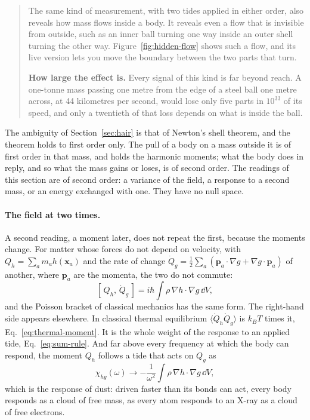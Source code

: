 \begin{quote}
The same kind of measurement, with two tides applied in either order, also
reveals how mass flows inside a body. It reveals even a flow that is invisible
from outside, such as an inner ball turning one way inside an outer shell
turning the other way. Figure~\ref{fig:hidden-flow} shows such a flow, and its live version lets you move the boundary between the two parts that turn.

\textbf{How large the effect is.} Every signal of this kind is far beyond reach.
A one-tonne mass passing one metre from the edge of a steel ball one metre
across, at 44 kilometres per second, would lose only five parts in $10^{33}$ of
its speed, and only a twentieth of that loss depends on what is inside the ball.
\end{quote}

The ambiguity of Section~\ref{sec:hair} is that of Newton's shell theorem, and
the theorem holds to first order only. The pull of a body on a mass outside it
is of first order in that mass, and holds the harmonic moments; what the body
does in reply, and so what the mass gains or loses, is of second order. The
readings of this section are of second order: a variance of the field, a
response to a second mass, or an energy exchanged with one. They have no null
space.

\paragraph{The field at two times.} A second reading, a moment later, does not
repeat the first, because the moments change. For matter whose forces do not depend on
velocity, with $Q_h = \sum_a m_a h(\mathbf x_a)$ and the rate of change
$\dot Q_g = \tfrac12\sum_a(\mathbf p_a\cdot\nabla g + \nabla g\cdot\mathbf p_a)$
of another, where $\mathbf p_a$ are the momenta, the two do not commute:
\begin{equation}\label{eq:hair-commutator}
[\,Q_h,\,\dot Q_g\,] = i\hbar\int\rho\,\nabla h\cdot\nabla g\,\dd V ,
\end{equation}
and the Poisson bracket of classical mechanics has the same form. The
right-hand side appears elsewhere. In classical thermal
equilibrium $\langle\dot Q_h\dot Q_g\rangle$ is $k_BT$ times it,
Eq.~\eqref{eq:thermal-moment}. It is the whole weight of the response to an
applied tide,
Eq.~\eqref{eq:sum-rule}. And far above every frequency at which
the body can respond, the moment $Q_h$ follows a tide that acts on $Q_g$ as
\begin{equation}\label{eq:dust}
\chi_{hg}(\omega) \to -\frac{1}{\omega^2}\int\rho\,\nabla h\cdot\nabla g\,\dd V ,
\end{equation}
which is the response of dust: driven faster than its bonds can act, every body
responds as a cloud of free mass, as every atom responds to an X-ray as a cloud
of free electrons.

